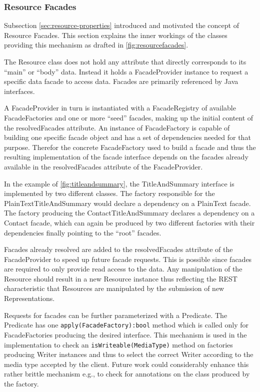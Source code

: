 \documentclass[11pt,a4paper,headsepline,twoside]{scrartcl}		%
\begin{document}
\subsubsection{Resource Facades}
\label{sec:resourcefacades}

Subsection \ref{sec:resource-properties} introduced and motivated the concept of
Resource Facades. This section explains the inner workings of the classes
providing this mechanism as drafted in \autoref{fig:resourcefacades}.

The Resource class does not hold any attribute that directly corresponds to its
``main'' or ``body'' data. Instead it holds a FacadeProvider instance to request
a specific data facade to access data. Facades are primarily referenced by Java
interfaces.

A FacadeProvider in turn is instantiated with a FacadeRegistry of available
FacadeFactories and one or more ``seed'' facades, making up the initial content
of the resolvedFacades attribute. An instance of FacadeFactory is capable of
building one specific facade object and has a set of dependencies needed for
that purpose. Therefor the concrete FacadeFactory used to build a facade and
thus the resulting implementation of the facade interface depends on the facades
already available in the resolvedFacades attribute of the FacadeProvider.

In the example of \autoref{fig:titleandsummary}, the TitleAndSummary interface
is implemented by two different classes. The factory responsible for the
PlainTextTitleAndSummary would declare a dependency on a PlainText facade. The
factory producing the ContactTitleAndSummary declares a dependency on a Contact
facade, which can again be produced by two different factories with their
dependencies finally pointing to the ``root'' facades.

Facades already resolved are added to the resolvedFacades attribute of the
FacadeProvider to speed up future facade requests. This is possible since
facades are required to only provide read access to the data. Any manipulation
of the Resource should result in a new Resource instance thus reflecting the
REST characteristic that Resources are manipulated by the submission of new
Representations.

Requests for facades can be further parameterized with a Predicate. The
Predicate has one \lstinline;apply(FacadeFactory):bool; method which is called
only for FacadeFactories producing the desired interface. This mechanism is used
in the implementation to check an \lstinline:isWriteable(MediaType): method on
factories producing Writer instances and thus to select the correct Writer
according to the media type accepted by the client. Future work could
considerably enhance this rather brittle mechanism e.g., to check for
annotations on the class produced by the factory.
\end{document}
